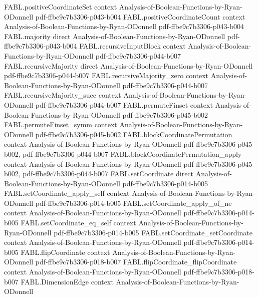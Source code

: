 \begin{theorem}
\proofstep
  {FABL.positiveCoordinateSet}
  {context}
  {Analysis-of-Boolean-Functions-by-Ryan-ODonnell}
  {pdf-ffbe9c7b3306-p043-b004}
\proofstep
  {FABL.positiveCoordinateCount}
  {context}
  {Analysis-of-Boolean-Functions-by-Ryan-ODonnell}
  {pdf-ffbe9c7b3306-p043-b004}
\proofstep
  {FABL.majority}
  {direct}
  {Analysis-of-Boolean-Functions-by-Ryan-ODonnell}
  {pdf-ffbe9c7b3306-p043-b004}
\proofstep
  {FABL.recursiveInputBlock}
  {context}
  {Analysis-of-Boolean-Functions-by-Ryan-ODonnell}
  {pdf-ffbe9c7b3306-p044-b007}
\proofstep
  {FABL.recursiveMajority}
  {direct}
  {Analysis-of-Boolean-Functions-by-Ryan-ODonnell}
  {pdf-ffbe9c7b3306-p044-b007}
\proofstep
  {FABL.recursiveMajority_zero}
  {context}
  {Analysis-of-Boolean-Functions-by-Ryan-ODonnell}
  {pdf-ffbe9c7b3306-p044-b007}
\proofstep
  {FABL.recursiveMajority_succ}
  {context}
  {Analysis-of-Boolean-Functions-by-Ryan-ODonnell}
  {pdf-ffbe9c7b3306-p044-b007}
\proofstep
  {FABL.permuteFinset}
  {context}
  {Analysis-of-Boolean-Functions-by-Ryan-ODonnell}
  {pdf-ffbe9c7b3306-p045-b002}
\proofstep
  {FABL.permuteFinset_symm}
  {context}
  {Analysis-of-Boolean-Functions-by-Ryan-ODonnell}
  {pdf-ffbe9c7b3306-p045-b002}
\proofstep
  {FABL.blockCoordinatePermutation}
  {context}
  {Analysis-of-Boolean-Functions-by-Ryan-ODonnell}
  {pdf-ffbe9c7b3306-p045-b002,
    pdf-ffbe9c7b3306-p044-b007}
\proofstep
  {FABL.blockCoordinatePermutation_apply}
  {context}
  {Analysis-of-Boolean-Functions-by-Ryan-ODonnell}
  {pdf-ffbe9c7b3306-p045-b002,
    pdf-ffbe9c7b3306-p044-b007}
\proofstep
  {FABL.setCoordinate}
  {direct}
  {Analysis-of-Boolean-Functions-by-Ryan-ODonnell}
  {pdf-ffbe9c7b3306-p014-b005}
\proofstep
  {FABL.setCoordinate_apply_self}
  {context}
  {Analysis-of-Boolean-Functions-by-Ryan-ODonnell}
  {pdf-ffbe9c7b3306-p014-b005}
\proofstep
  {FABL.setCoordinate_apply_of_ne}
  {context}
  {Analysis-of-Boolean-Functions-by-Ryan-ODonnell}
  {pdf-ffbe9c7b3306-p014-b005}
\proofstep
  {FABL.setCoordinate_eq_self}
  {context}
  {Analysis-of-Boolean-Functions-by-Ryan-ODonnell}
  {pdf-ffbe9c7b3306-p014-b005}
\proofstep
  {FABL.setCoordinate_setCoordinate}
  {context}
  {Analysis-of-Boolean-Functions-by-Ryan-ODonnell}
  {pdf-ffbe9c7b3306-p014-b005}
\proofstep
  {FABL.flipCoordinate}
  {context}
  {Analysis-of-Boolean-Functions-by-Ryan-ODonnell}
  {pdf-ffbe9c7b3306-p018-b007}
\proofstep
  {FABL.flipCoordinate_flipCoordinate}
  {context}
  {Analysis-of-Boolean-Functions-by-Ryan-ODonnell}
  {pdf-ffbe9c7b3306-p018-b007}
\proofstep
  {FABL.DimensionEdge}
  {context}
  {Analysis-of-Boolean-Functions-by-Ryan-ODonnell}

\end{theorem}
